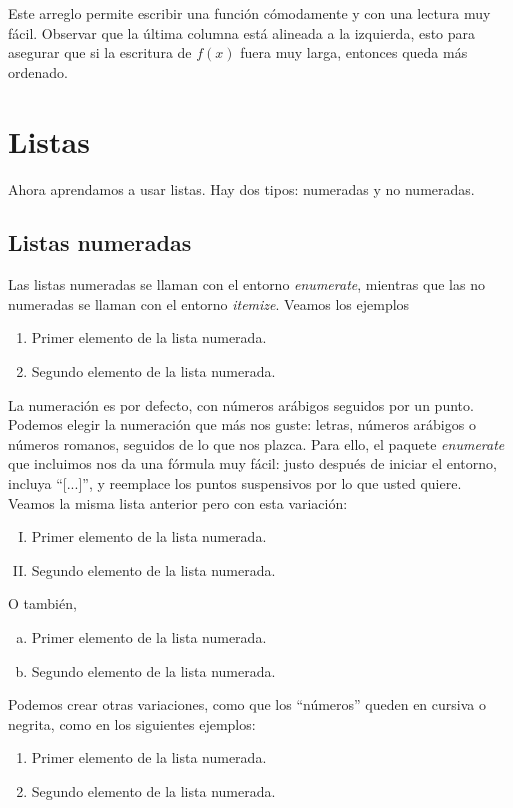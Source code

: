 \documentclass{article}
\begin{document}
Este arreglo permite escribir una función cómodamente y con una lectura muy fácil. Observar que la última columna está alineada a la izquierda, esto para asegurar que si la escritura de $f(x)$ fuera muy larga, entonces queda más ordenado.

\section*{Listas}
Ahora aprendamos a usar listas. Hay dos tipos: numeradas y no numeradas. 

\subsection*{Listas numeradas}
Las listas numeradas se llaman con el entorno \textit{enumerate}, mientras que las no numeradas se llaman con el entorno \textit{itemize}. Veamos los ejemplos
	\begin{enumerate}
		\item Primer elemento de la lista numerada.
		\item Segundo elemento de la lista numerada.		
	\end{enumerate}

La numeración es por defecto, con números arábigos seguidos por un punto. Podemos elegir la numeración que más nos guste: letras, números arábigos o números romanos, seguidos de lo que nos plazca. Para ello, el paquete \textit{enumerate} que incluimos nos da una fórmula muy fácil: justo después de iniciar el entorno, incluya ``[...]'', y reemplace los puntos suspensivos por lo que usted quiere. Veamos la misma lista anterior pero con esta variación:
	\begin{enumerate}[I)]
		\item Primer elemento de la lista numerada.
		\item Segundo elemento de la lista numerada.		
	\end{enumerate}

O también,
	\begin{enumerate}[a)]
		\item Primer elemento de la lista numerada.
		\item Segundo elemento de la lista numerada.		
	\end{enumerate}

Podemos crear otras variaciones, como que los ``números'' queden en cursiva o negrita, como en los siguientes ejemplos:
	\begin{enumerate}[\it a)]
		\item Primer elemento de la lista numerada.
		\item Segundo elemento de la lista numerada.		
	\end{enumerate}
\end{document}
